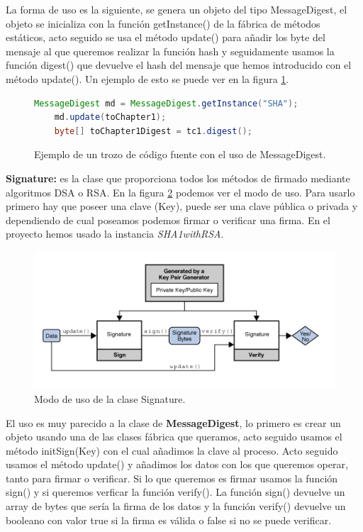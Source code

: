 La forma de uso es la siguiente, se genera un objeto del tipo MessageDigest, el objeto se inicializa con la función getInstance() de la fábrica de métodos estáticos, acto seguido se usa el método update() para añadir los byte del mensaje al que queremos realizar la función hash y seguidamente usamos la función digest() que devuelve el hash del mensaje que hemos introducido con el método update(). Un ejemplo de esto se puede ver en la figura \ref{cod:digest}.

\begin{figure}

	\begin{scriptsize}
	\begin{lstlisting}[language=Java] 
	MessageDigest md = MessageDigest.getInstance("SHA");
	md.update(toChapter1);
	byte[] toChapter1Digest = tc1.digest();
	\end{lstlisting}
	\end{scriptsize}
		\caption{Ejemplo de un trozo de código fuente con el uso de MessageDigest.}
		\label{cod:digest}
\end{figure}

\textbf{Signature:} es la clase que proporciona todos los métodos de firmado mediante algoritmos DSA o RSA. En la figura \ref{fig:signature} podemos ver el modo de uso. Para usarlo primero hay que poseer una clave (Key), puede ser una clave pública o privada y dependiendo de cual poseamos podemos firmar o verificar una firma. En el proyecto hemos usado la instancia \textit{SHA1withRSA}.

\begin{figure}
  \centering
    \includegraphics[scale=1]{./Criptografia/imagenes/signature.png}
  \caption{Modo de uso de la clase Signature.}
  \label{fig:signature}
\end{figure} 

El uso es muy parecido a la clase de \textbf{MessageDigest}, lo primero es crear un objeto usando una de las clases fábrica que queramos, acto seguido usamos el método initSign(Key) con el cual añadimos la clave al proceso. Acto seguido usamos el método update() y añadimos los datos con los que queremos operar, tanto para firmar o verificar. Si lo que queremos es firmar usamos la función sign() y si queremos verficar la función verify(). La función sign() devuelve un array de bytes que sería la firma de los datos y la función verify() devuelve un booleano con valor true si la firma es válida o false si no se puede verificar.

